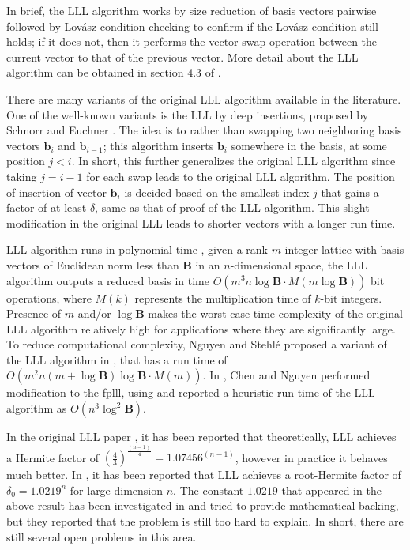 In brief, the LLL algorithm works by size reduction of basis vectors pairwise followed by Lov\'asz condition checking to confirm if the Lov\'asz condition still holds; if it does not, then it performs the vector swap operation between the current vector to that of the previous vector.
More detail about the LLL algorithm can be obtained in section 4.3 of \cite{bremner2011lattice}.

There are many variants of the original LLL algorithm available in the literature.
One of the well-known variants is the LLL by deep
insertions, proposed by Schnorr and Euchner \cite{schnorr1994lattice}.
The idea is to rather than swapping two neighboring basis vectors $\pmb{b}_i$ and $\pmb{b}_{i-1}$; this algorithm inserts $\pmb{b}_i$ somewhere in the basis, at some position $j<i$.
In short, this further generalizes the original LLL algorithm since taking $ j=i-1 $ for each swap leads to the original LLL algorithm.
The position of insertion of vector $\pmb{b}_i$ is decided based on the smallest index $j$ that gains a factor of at least $\delta$, same as that of proof of the LLL algorithm.
This slight modification in the original LLL leads to shorter vectors with a longer run time.

LLL algorithm runs in polynomial time \cite{bremner2011lattice}, given a rank $m$ integer lattice with basis vectors of Euclidean norm less than $\pmb{B}$ in an $n$-dimensional space, the LLL algorithm outputs a reduced basis in time $O(m^3n \log{\pmb{B}}\cdot M(m\log{\pmb{B}}))$ bit operations, where $M(k)$ represents the multiplication time of $k$-bit integers.
Presence of $m$ and/or $\log{\pmb{B}}$ makes the worst-case time complexity of the original LLL algorithm relatively high for applications where they are significantly large.
To reduce computational complexity, Nguyen and Stehl\'e proposed a variant of the LLL algorithm in \cite{nguyen2009lll}, that has a run time of $O(m^2n(m+\log{\pmb{B}}) \log{\pmb{B}}\cdot M(m))$.
In \cite{chen2011bkz}, Chen and Nguyen performed modification to the fplll\cite{cade2008fplll}, using \cite{novocin2011lll} and reported a heuristic run time of the LLL algorithm as $O(n^3\log^2\pmb{B})$.

In the original LLL paper \cite{lenstra1982factoring}, it has been reported that theoretically, LLL achieves a Hermite factor of $(\frac{4}{3})^{\frac{(n-1)}{4}}=1.07456^{(n-1)}$, however in practice it behaves much better.
In \cite{gama2008predicting}, it has been reported that LLL achieves a root-Hermite factor of $\delta_0= 1.0219^n$ for large dimension $n$.
The constant $1.0219$ that appeared in the above result has been investigated in \cite{vallee2009probabilistic} and tried to provide mathematical backing, but they reported that the problem is still too hard to explain.
In short, there are still several open problems in this area.

